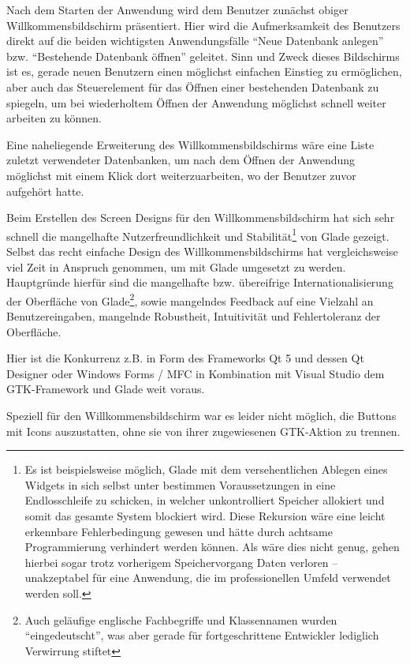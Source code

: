Nach dem Starten der Anwendung wird dem Benutzer zunächst obiger Willkommensbildschirm präsentiert. Hier wird die
Aufmerksamkeit des Benutzers direkt auf die beiden wichtigsten Anwendungsfälle ``Neue Datenbank anlegen'' bzw.
``Bestehende Datenbank öffnen'' geleitet. Sinn und Zweck dieses Bildschirms ist es, gerade neuen Benutzern einen möglichst
einfachen Einstieg zu ermöglichen, aber auch das Steuerelement für das Öffnen einer bestehenden Datenbank zu spiegeln,
um bei wiederholtem Öffnen der Anwendung möglichst schnell weiter arbeiten zu können.

Eine naheliegende Erweiterung des Willkommensbildschirms wäre eine Liste zuletzt verwendeter Datenbanken, um nach dem
Öffnen der Anwendung möglichst mit einem Klick dort weiterzuarbeiten, wo der Benutzer zuvor aufgehört hatte.

Beim Erstellen des Screen Designs für den Willkommensbildschirm hat sich sehr schnell die mangelhafte Nutzerfreundlichkeit
und Stabilität\footnote{Es ist beispielsweise möglich, Glade mit dem versehentlichen Ablegen eines Widgets in sich
selbst unter bestimmen Voraussetzungen in eine Endlosschleife zu schicken, in welcher unkontrolliert Speicher allokiert
und somit das gesamte System blockiert wird. Diese Rekursion wäre eine leicht erkennbare Fehlerbedingung gewesen und hätte
durch achtsame Programmierung verhindert werden können. Als wäre dies nicht genug, gehen hierbei sogar trotz vorherigem
Speichervorgang Daten verloren -- unakzeptabel für eine Anwendung, die im professionellen Umfeld verwendet werden soll.}
von Glade gezeigt. Selbst das recht einfache Design des Willkommensbildschirms hat vergleichsweise viel
Zeit in Anspruch genommen, um mit Glade umgesetzt zu werden.
Hauptgründe hierfür sind die mangelhafte bzw. übereifrige Internationalisierung der Oberfläche von Glade\footnote{Auch geläufige
englische Fachbegriffe und Klassennamen wurden ``eingedeutscht'', was aber gerade für fortgeschrittene Entwickler
lediglich Verwirrung stiftet}, sowie mangelndes Feedback auf eine Vielzahl an Benutzereingaben, mangelnde Robustheit,
Intuitivität und Fehlertoleranz der Oberfläche.

Hier ist die Konkurrenz z.B. in Form des Frameworks Qt 5 und dessen Qt Designer oder Windows Forms / MFC in Kombination
mit Visual Studio dem GTK-Framework und Glade weit voraus.

Speziell für den Willkommensbildschirm war es leider nicht möglich, die Buttons mit Icons auszustatten, ohne sie von ihrer
zugewiesenen GTK-Aktion zu trennen.

